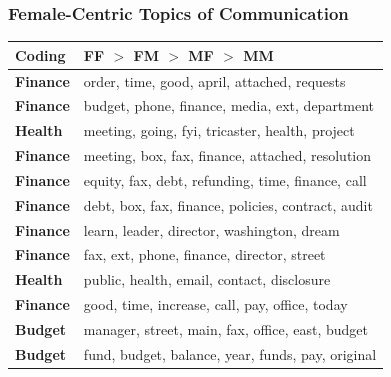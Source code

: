 \documentclass[xcolor={table}]{beamer}
\newenvironment{changemargin}[2]{%
  \begin{list}{}{%
    \setlength{\topsep}{0pt}%
    \setlength{\leftmargin}{#1}%
    \setlength{\rightmargin}{#2}%
    \setlength{\listparindent}{\parindent}%
    \setlength{\itemindent}{\parindent}%
    \setlength{\parsep}{\parskip}%
  }%
  \item[]}{\end{list}}
\begin{document}
\begin{frame}\frametitle{Female-Centric Topics of Communication}
	
	
\begin{changemargin}{-1cm}{ -1cm}	
	\centering
		\begin{tabular}{ll}
			\toprule
	Coding & FF $>$ FM $>$ MF $>$ MM\\
	\midrule

	\textbf{Finance} & order, time, good, april, attached, requests \\ 
	\textbf{Finance} & budget, phone, finance, media, ext, department
	\\ 
	\textbf{Health} & meeting, going, fyi, tricaster, health, project
	 \\ 
	\textbf{Finance} & meeting, box, fax, finance, attached, resolution
	\\ 
	\textbf{Finance} & equity, fax, debt, refunding, time, finance, call
	 \\ 
	\textbf{Finance} & debt, box, fax, finance, policies, contract, audit
	\\ 
	\textbf{Finance} & learn, leader, director, washington, dream
	\\ 
	\textbf{Finance} & fax, ext, phone, finance, director, street
	\\ 
	\textbf{Health} & public, health, email, contact, disclosure

	\\ 
	\textbf{Finance} & good, time, increase, call, pay, office, today
	
	\\ 
	\textbf{Budget} & manager, street, main, fax, office, east, budget
	
	\\ 
	\textbf{Budget} & fund, budget, balance, year, funds, pay, original
	
	\\

			\bottomrule
		\end{tabular}
		\end{changemargin}
\end{frame}
\end{document}
